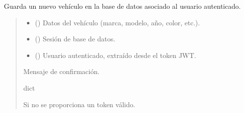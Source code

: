 \documentclass[letterpaper,10pt,spanish]{sphinxmanual}
\begin{document}
\begin{fulllineitems}
\label{\detokenize{endpoints:main.guardar_vehiculo}}
\pysigstartsignatures
\pysiglinewithargsret
{}
{\sphinxparamcomma {}\sphinxparamcomma {}}
{}
\pysigstopsignatures
\sphinxAtStartPar
Guarda un nuevo vehículo en la base de datos asociado al usuario autenticado.
\begin{quote}\begin{description}
\begin{itemize}
\item {} 
\sphinxAtStartPar
{} () \textendash{} Datos del vehículo (marca, modelo, año, color, etc.).

\item {} 
\sphinxAtStartPar
{} () \textendash{} Sesión de base de datos.

\item {} 
\sphinxAtStartPar
{} ({\hyperref[\detokenize{modelos:main.Usuario}]{}}) \textendash{} Usuario autenticado, extraído desde el token JWT.

\end{itemize}

\sphinxAtStartPar
Mensaje de confirmación.

\sphinxAtStartPar
dict

\sphinxAtStartPar
{} \textendash{} Si no se proporciona un token válido.

\end{description}\end{quote}

\end{fulllineitems}
\end{document}
